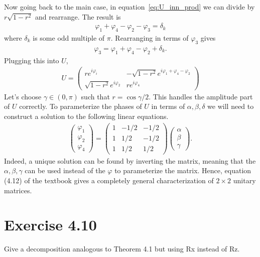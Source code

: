 \documentclass{book}
\begin{document}
    Now going back to the main case, in equation~\eqref{eq:U_inn_prod} we can divide by $r\sqrt{1-r^2}$ and rearrange. The result is
    \begin{align}
        \varphi_1 +\varphi_4 - \varphi_2 -\varphi_3 = \delta_k
    \end{align}
    where $\delta_k$ is some odd multiple of $\pi$. Rearranging in terms of $\varphi_3$ gives
    \begin{align}
        \varphi_3 = \varphi_1 + \varphi_4 - \varphi_2 + \delta_k.
    \end{align}
    Plugging this into $U$,
    \begin{align}
        U = \begin{pmatrix}
            r e^{i\varphi_i} & -\sqrt{1-r^2} e^{i\varphi_1 + \varphi_4 -\varphi_2} \\
            \sqrt{1-r^2} e^{i\varphi_2} & r e^{i\varphi_4}
        \end{pmatrix}
    \end{align}
    Let's choose $\gamma \in (0,\pi)$ such that $r = \cos\gamma/2$. This handles the amplitude part of $U$ correctly. To parameterize the phases of $U$ in terms of $\alpha, \beta, \delta$ we will need to construct a solution to the following linear equations.
    \begin{align}
        \begin{pmatrix}
            \varphi_1 \\
            \varphi_2 \\
            \varphi_4
        \end{pmatrix} = \begin{pmatrix}
            1 & -1/2 & -1/2 \\
            1 & 1/2 & -1/2 \\
            1 & 1/2 & 1/2 
        \end{pmatrix} \begin{pmatrix}
            \alpha \\
            \beta \\
            \gamma
        \end{pmatrix}. 
    \end{align}
    Indeed, a unique solution can be found by inverting the matrix, meaning that the $\alpha,\beta,\gamma$ can be used instead of the $\varphi$ to parameterize the matrix. Hence, equation (4.12) of the textbook gives a completely general characterization of $2\times 2$ unitary matrices. 
    
\section*{Exercise 4.10}
    Give a decomposition analogous to Theorem 4.1 but using Rx instead of Rz.
\end{document}
